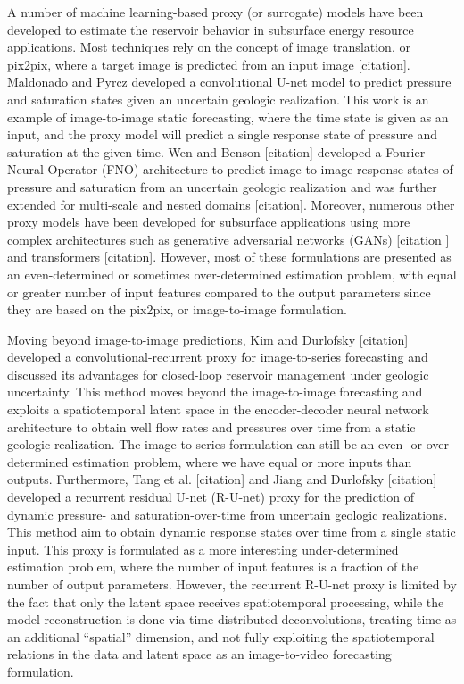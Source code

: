 \documentclass[default,iicol,lineno]{sn-jnl}%
\begin{document}
A number of machine learning-based proxy (or surrogate) models have been developed to estimate the reservoir behavior in subsurface energy resource applications. Most techniques rely on the concept of image translation, or pix2pix, where a target image is predicted from an input image [citation]. Maldonado and Pyrcz \cite{Maldonado2021Unet} developed a convolutional U-net model to predict pressure and saturation states given an uncertain geologic realization. This work is an example of image-to-image static forecasting, where the time state is given as an input, and the proxy model will predict a single response state of pressure and saturation at the given time. Wen and Benson [citation] developed a Fourier Neural Operator (FNO) architecture to predict image-to-image response states of pressure and saturation from an uncertain geologic realization and was further extended for multi-scale and nested domains [citation]. Moreover, numerous other proxy models have been developed for subsurface applications using more complex architectures such as generative adversarial networks (GANs) [citation ] and transformers [citation]. However, most of these formulations are presented as an even-determined or sometimes over-determined estimation problem, with equal or greater number of input features compared to the output parameters since they are based on the pix2pix, or image-to-image formulation.

Moving beyond image-to-image predictions, Kim and Durlofsky [citation] developed a convolutional-recurrent proxy for image-to-series forecasting and discussed its advantages for closed-loop reservoir management under geologic uncertainty. This method moves beyond the image-to-image forecasting and exploits a spatiotemporal latent space in the encoder-decoder neural network architecture to obtain well flow rates and pressures over time from a static geologic realization. The image-to-series formulation can still be an even- or over-determined estimation problem, where we have equal or more inputs than outputs. Furthermore, Tang et al. [citation] and Jiang and Durlofsky [citation] developed a recurrent residual U-net (R-U-net) proxy for the prediction of dynamic pressure- and saturation-over-time from uncertain geologic realizations. This method aim to obtain dynamic response states over time from a single static input. This proxy is formulated as a more interesting under-determined estimation problem, where the number of input features is a fraction of the number of output parameters. However, the recurrent R-U-net proxy is limited by the fact that only the latent space receives spatiotemporal processing, while the model reconstruction is done via time-distributed deconvolutions, treating time as an additional “spatial” dimension, and not fully exploiting the spatiotemporal relations in the data and latent space as an image-to-video forecasting formulation.
\end{document}
